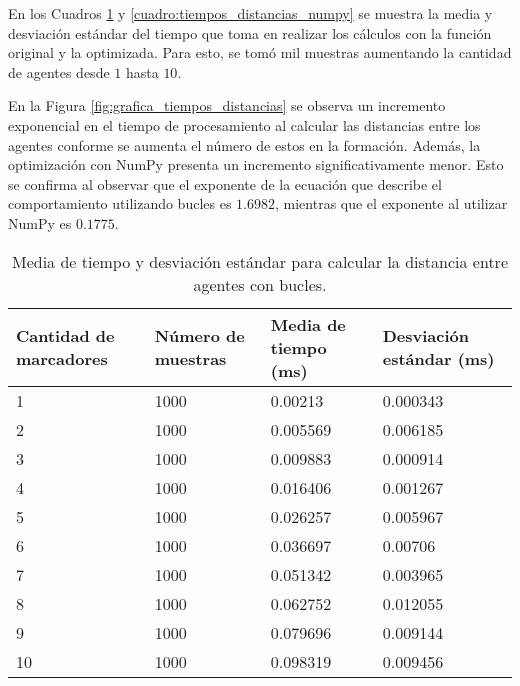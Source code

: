 En los Cuadros \ref{cuadro:tiempos_distancias_for} y \ref{cuadro:tiempos_distancias_numpy} se muestra la media y desviación estándar del tiempo que toma en realizar los cálculos con la función original y la optimizada. Para esto, se tomó mil muestras aumentando la cantidad de agentes desde $1$ hasta $10$. 

En la Figura \ref{fig:grafica_tiempos_distancias} se observa un incremento exponencial en el tiempo de procesamiento al calcular las distancias entre los agentes conforme se aumenta el número de estos en la formación. Además, la optimización con NumPy presenta un incremento significativamente menor. Esto se confirma al observar que el exponente de la ecuación que describe el comportamiento utilizando bucles es $1.6982$, mientras que el exponente al utilizar NumPy es $0.1775$.

\begin{table}[H]
	\centering
	\resizebox{\textwidth}{!} {
	\begin{tabular}{|l|l|l|l|}
		\hline
		\textbf{Cantidad de marcadores} & \textbf{Número de muestras} & \textbf{Media de tiempo (ms)} & \textbf{Desviación estándar (ms)} \\ \hline
		1 & 1000 & 0.00213 & 0.000343 \\ \hline
		2 & 1000 & 0.005569 & 0.006185 \\ \hline
		3 & 1000 & 0.009883 & 0.000914 \\ \hline
		4 & 1000 & 0.016406 & 0.001267 \\ \hline
		5 & 1000 & 0.026257 & 0.005967 \\ \hline
		6 & 1000 & 0.036697 & 0.00706 \\ \hline
		7 & 1000 & 0.051342 & 0.003965 \\ \hline
		8 & 1000 & 0.062752 & 0.012055 \\ \hline
		9 & 1000 & 0.079696 & 0.009144 \\ \hline
		10 & 1000 & 0.098319 & 0.009456 \\ \hline
	\end{tabular}}
	\caption{Media de tiempo y desviación estándar para calcular la distancia entre agentes con bucles.}
	\label{cuadro:tiempos_distancias_for}
\end{table}

